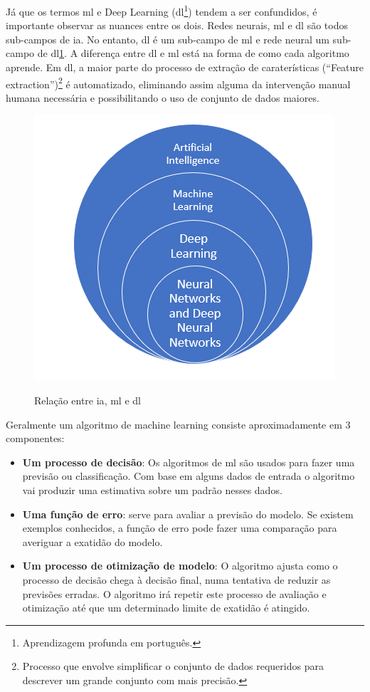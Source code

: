 Já que os termos \ac{ml} e Deep Learning (\ac{dl}\footnote{Aprendizagem profunda em português.}) tendem a ser confundidos, é importante observar as nuances entre os dois. Redes neurais, \ac{ml} e \ac{dl} são todos sub-campos de \ac{ia}. No entanto, \ac{dl} é um sub-campo de \ac{ml} e rede neural um sub-campo de \ac{dl}\ref{relation}. A diferença entre \ac{dl} e \ac{ml} está na forma de como cada algoritmo aprende. Em \ac{dl}, a maior parte do processo de extração de caraterísticas (``Feature extraction'')\footnote{Processo que envolve simplificar o conjunto de dados requeridos para descrever um grande conjunto com mais precisão.} é automatizado, eliminando assim alguma da intervenção manual humana necessária e possibilitando o uso de conjunto de dados maiores. \cite{MLIBM}




\begin{figure}[H]
\centering
\includegraphics[scale=0.6]{figs/ai_relationship}
\caption{Relação entre \ac{ia}, \ac{ml} e \ac{dl} }\cite{imagemRelation}\label{relation}
\end{figure}



Geralmente um algoritmo de machine learning consiste aproximadamente em 3 componentes:

\begin{itemize}
\item \textbf{Um processo de decisão}: Os algoritmos de \ac{ml} são usados para fazer uma previsão ou classificação. Com base em alguns dados de entrada o algoritmo vai produzir uma estimativa sobre um padrão nesses dados.
\item \textbf{Uma função de erro}: serve para avaliar a previsão do modelo. Se existem exemplos conhecidos, a função de erro pode fazer uma comparação para averiguar a exatidão do modelo.
\item \textbf{Um processo de otimização de modelo}: O algoritmo ajusta como o processo de decisão chega à decisão final, numa tentativa de reduzir as previsões erradas. O algoritmo irá repetir este processo de avaliação e otimização até que um determinado limite de exatidão é atingido.
\end{itemize}

